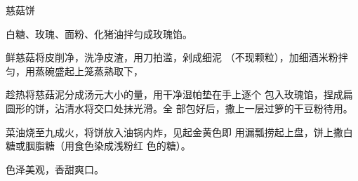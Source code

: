 \begin{recipe}{慈菇饼}

\ingredients


\cooking

\step 白糖、玫瑰、面粉、化猪油拌匀成玫瑰馅。

\step 鲜慈菇将皮削净，洗净皮渣，用刀拍滥，剁成细泥 （不现颗粒），加细酒米粉拌匀，用蒸碗盛起上笼蒸熟取下，

趁热将慈菇泥分成汤元大小的量，用干净湿帕垫在手上逐个 包入玫瑰馅，捏成扁圆形的饼，沾清水将交口处抹光滑。全 部包好后，撒上一层过箩的干豆粉待用。

菜油烧至九成火，将饼放入油锅内炸，见起金黄色即 用漏瓢捞起上盘，饼上撒白糖或胭脂糖（用食色染成浅粉红 色的糖）。

\notes

色泽美观，香甜爽口。

\end{recipe}

